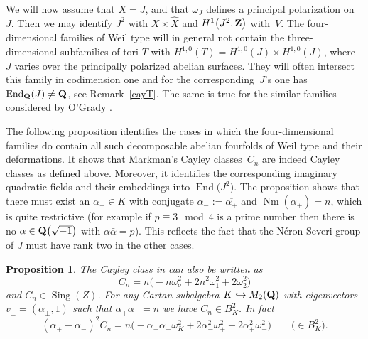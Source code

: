 \documentclass[pdftex]{sigma}
\numberwithin{equation}{section}
\newtheorem{Proposition}[Theorem]{Proposition}
 { \theoremstyle{definition}
\newtheorem{Definition}[Theorem]{Definition}
\newtheorem{Note}[Theorem]{Note}
\newtheorem{Example}[Theorem]{Example}
\newtheorem{Remark}[Theorem]{Remark} }
\begin{document}
We will now assume that $X=J$, and that $\omega_J$ defines a principal polarization on~$J$.
Then we may identify $J^2$ with $X\times\widehat{X}$ and $H^1\big(J^2,{\bf Z}\big)$ with~$V$.
The four-dimensional families of Weil type will in general not
contain the three-dimensional subfamilies of
tori $T$ with $H^{1,0}(T)=H^{1,0}(J)\times H^{1,0}(J)$, where $J$ varies over the principally
polarized abelian surfaces.
They will often intersect this family in codimension one
and for the corresponding~$J$'s one has $\operatorname{End}_{\bf Q}(J)\neq {\bf Q}$, see Remark~\ref{cayT}.
The same is true for the similar families considered by O'Grady \cite[Theorem~5.1]{O'G}.

The following proposition identifies the cases in which the four-dimensional families
do contain all such decomposable abelian fourfolds of Weil type and their deformations.
It shows that Markman's Cayley classes~$C_n$ are indeed Cayley classes
as defined above. Moreover, it identifies
the corresponding imaginary quadratic fields and their embeddings into $\operatorname{End}\big(J^2\big)$.
The proposition shows that there must exist an
$\alpha_+\in K$ with conjugate $\alpha_-:=\overline{\alpha_+}$ and $\operatorname{Nm}(\alpha_+)=n$,
which is quite restrictive (for example if $p\equiv 3 \mod 4$ is a prime number then
there is no $\alpha\in {\bf Q}\big(\sqrt{-1}\big)$ with $\alpha\bar{\alpha}=p$).
This reflects the fact that the N\'eron Severi group of $J$ must have
rank two in the other cases.

\begin{Proposition} \label{propmarkman}
The Cayley class in {\rm \cite[Proposition~11.2]{Markman}} can also be written as
\[
C_n = n\big({-}n\omega_\sigma^2 + 2n^2\omega_1^2 + 2\omega_2^2\big)
\]
and $C_n\in \operatorname{Sing}(Z)$.
For any Cartan subalgebra $K\hookrightarrow M_2({\bf Q})$
with eigenvectors $v_\pm=(\alpha_\pm,1)$ such that
$\alpha_+\alpha_-=n$ we have $C_n\in B^2_K$. In fact
\[
(\alpha_+ - \alpha_-)^2C_{n} = n\big({-}\alpha_+\alpha_-\omega_K^2
 + 2\alpha_-^2\omega_+^2+2\alpha_+^2\omega_-^2\big)\qquad\big(\!\!\in B^2_K\big).
\]
\end{Proposition}
\end{document}
